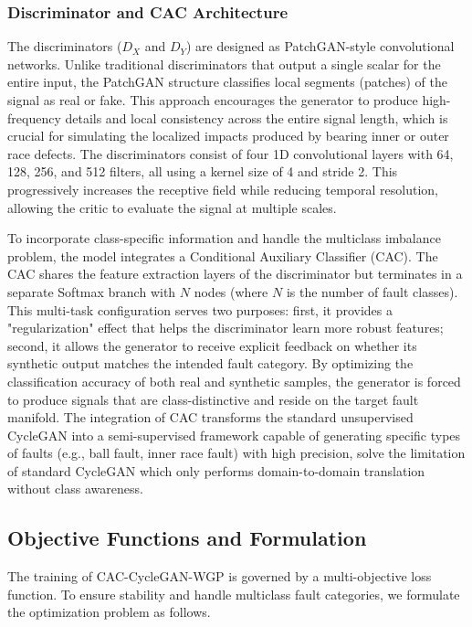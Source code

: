 \subsubsection{Discriminator and CAC Architecture}
The discriminators ($D_X$ and $D_Y$) are designed as PatchGAN-style convolutional networks. Unlike traditional discriminators that output a single scalar for the entire input, the PatchGAN structure classifies local segments (patches) of the signal as real or fake. This approach encourages the generator to produce high-frequency details and local consistency across the entire signal length, which is crucial for simulating the localized impacts produced by bearing inner or outer race defects. The discriminators consist of four 1D convolutional layers with 64, 128, 256, and 512 filters, all using a kernel size of 4 and stride 2. This progressively increases the receptive field while reducing temporal resolution, allowing the critic to evaluate the signal at multiple scales.

To incorporate class-specific information and handle the multiclass imbalance problem, the model integrates a Conditional Auxiliary Classifier (CAC). The CAC shares the feature extraction layers of the discriminator but terminates in a separate Softmax branch with $N$ nodes (where $N$ is the number of fault classes). This multi-task configuration serves two purposes: first, it provides a "regularization" effect that helps the discriminator learn more robust features; second, it allows the generator to receive explicit feedback on whether its synthetic output matches the intended fault category. By optimizing the classification accuracy of both real and synthetic samples, the generator is forced to produce signals that are class-distinctive and reside on the target fault manifold. The integration of CAC transforms the standard unsupervised CycleGAN into a semi-supervised framework capable of generating specific types of faults (e.g., ball fault, inner race fault) with high precision, solve the limitation of standard CycleGAN which only performs domain-to-domain translation without class awareness.

\subsection{Objective Functions and Formulation}
The training of CAC-CycleGAN-WGP is governed by a multi-objective loss function. To ensure stability and handle multiclass fault categories, we formulate the optimization problem as follows.

